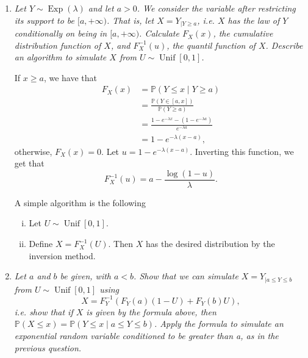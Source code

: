 \documentclass[a4paper,12pt]{article}
\newcommand{\unif}{\operatorname{Unif}}
\newcommand{\pr}{\mathbb{P}}
\theoremstyle{definition}
\begin{document}
\begin{enumerate}
    \item {\it Let $Y \sim \operatorname{Exp}(\lambda)$ and let $a > 0$. We consider the variable after restricting its support to be $[a, +\infty)$.
    That is, let $X = Y_{|Y \ge a}$, i.e. $X$ has the law of $Y$ conditionally on being in $[a, +\infty)$. Calculate
    $F_X(x)$, the cumulative distribution function of $X$, and
    $F^{-1}_X(u)$, the quantil function of $X$. Describe an algorithm to
    simulate $X$ from $U \sim \unif[0,1]$.}

    If $x \ge a$, we have that
    \begin{equation*}
        \begin{split}
            F_X(x) &= \pr(Y \le x \mid Y \ge a) \\
            &= \frac{\pr(Y \in [a, x])}{\pr(Y \ge a)} \\
            &= \frac{1 - e^{-\lambda x} - (1 - e^{-\lambda a})}{e^{-\lambda a}} \\
            &= 1 - e^{-\lambda(x - a)},
        \end{split}
    \end{equation*}
    otherwise, $F_X(x) = 0$. Let $u = 1 - e^{-\lambda(x - a)}$. Inverting this
    function, we get that 
    $$
    F_X^{-1}(u) = a-\frac{\log(1 - u)}{\lambda}.
    $$

    A simple algorithm is the following 
    \begin{enumerate}[(i)]
        \item Let $U \sim \unif[0,1]$. 
        \item Define $X = F_X^{-1}(U)$. Then $X$ has the desired distribution
        by the inversion method. 
    \end{enumerate}
    
    \item {\it Let $a$ and $b$ be given, with $a < b$. Show that we can simulate $X = Y_
    {|a \le Y \le b}$ from $U \sim \unif[0,1]$ using
    $$
    X= F_Y^{-1}(F_Y(a)(1 - U) + F_Y(b)U),
    $$
    i.e. show that if $X$ is given by the formula above, then $\pr(X \le
    x) = \pr(Y \le x\mid a \le Y \le b)$. Apply
    the formula to simulate an exponential random variable conditioned to
    be greater than a, as in the previous question.}


\end{enumerate}
\end{document}
